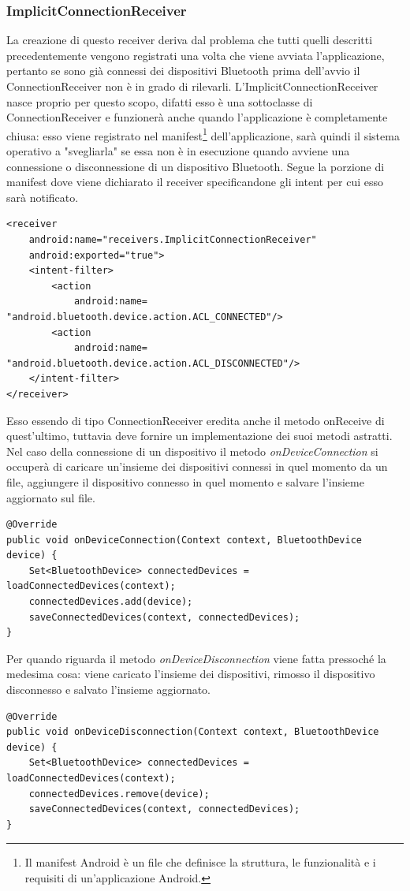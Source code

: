 \subsubsection{ImplicitConnectionReceiver}
La creazione di questo receiver deriva dal problema che tutti quelli descritti precedentemente vengono registrati una volta che viene avviata l'applicazione, pertanto se sono già connessi dei dispositivi Bluetooth prima dell'avvio il ConnectionReceiver non è in grado di rilevarli. L'ImplicitConnectionReceiver nasce proprio per questo scopo, difatti esso è una sottoclasse di ConnectionReceiver e funzionerà anche quando l'applicazione è completamente chiusa: esso viene registrato nel manifest\footnote{Il manifest Android è un file che definisce la struttura, le funzionalità e i requisiti di un'applicazione Android.} dell'applicazione, sarà quindi il sistema operativo a "svegliarla" se essa non è in esecuzione quando avviene una connessione o disconnessione di un dispositivo Bluetooth. Segue la porzione di manifest dove viene dichiarato il receiver specificandone gli intent per cui esso sarà notificato.
\begin{verbatim}
<receiver 
    android:name="receivers.ImplicitConnectionReceiver"
    android:exported="true">
    <intent-filter>
        <action 
            android:name= "android.bluetooth.device.action.ACL_CONNECTED"/>
        <action
            android:name= "android.bluetooth.device.action.ACL_DISCONNECTED"/>
    </intent-filter>
</receiver>
\end{verbatim}

Esso essendo di tipo ConnectionReceiver eredita anche il metodo onReceive di quest'ultimo, tuttavia deve fornire un implementazione dei suoi metodi astratti. Nel caso della connessione di un dispositivo il metodo \textit{onDeviceConnection} si occuperà di caricare un'insieme dei dispositivi connessi in quel momento da un file, aggiungere il dispositivo connesso in quel momento e salvare l'insieme aggiornato sul file.
\begin{verbatim}
@Override
public void onDeviceConnection(Context context, BluetoothDevice device) {
    Set<BluetoothDevice> connectedDevices = loadConnectedDevices(context);
    connectedDevices.add(device);
    saveConnectedDevices(context, connectedDevices);
}
\end{verbatim}

Per quando riguarda il metodo \textit{onDeviceDisconnection} viene fatta pressoché la medesima cosa: viene caricato l'insieme dei dispositivi, rimosso il dispositivo disconnesso e salvato l'insieme aggiornato.
\begin{verbatim}
@Override
public void onDeviceDisconnection(Context context, BluetoothDevice device) {
    Set<BluetoothDevice> connectedDevices = loadConnectedDevices(context);
    connectedDevices.remove(device);
    saveConnectedDevices(context, connectedDevices);
}
\end{verbatim}

